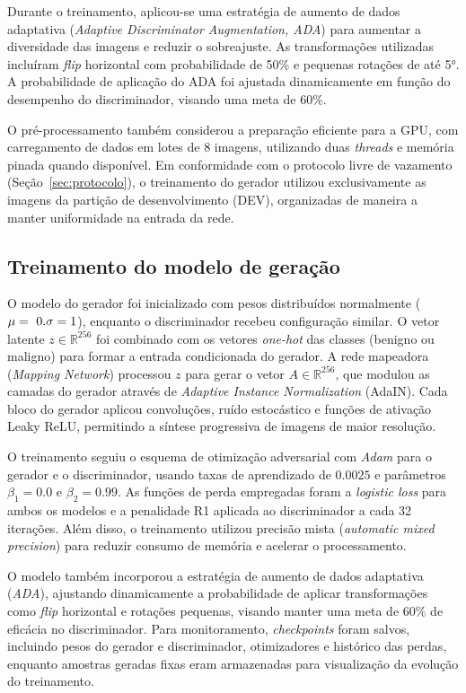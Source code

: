 \documentclass[
	12pt,				%
	openright,			%
	oneside,			%
	a4paper,			%
	tcc,			%
	]{ABNT-DC-UEL}
\begin{document}
Durante o treinamento, aplicou-se uma estratégia de aumento de dados adaptativa (\textit{Adaptive Discriminator Augmentation, ADA}) para aumentar a diversidade das imagens e reduzir o sobreajuste. As transformações utilizadas incluíram \textit{flip} horizontal com probabilidade de 50\% e pequenas rotações de até 5°. A probabilidade de aplicação do ADA foi ajustada dinamicamente em função do desempenho do discriminador, visando uma meta de 60\%.

O pré-processamento também considerou a preparação eficiente para a GPU, com carregamento de dados em lotes de 8 imagens, utilizando duas \textit{threads} e memória pinada quando disponível. Em conformidade com o protocolo livre de vazamento (Seção~\ref{sec:protocolo}), o treinamento do gerador utilizou exclusivamente as imagens da partição de desenvolvimento (DEV), organizadas de maneira a manter uniformidade na entrada da rede.
    
\subsection{Treinamento do modelo de geração}

O modelo do gerador foi inicializado com pesos distribuídos normalmente ($\mu = ~0.\\ \sigma = 1$), enquanto o discriminador recebeu configuração similar. O vetor latente $z \in \mathbb{R}^{256}$ foi combinado com os vetores \textit{one-hot} das classes (benigno ou maligno) para formar a entrada condicionada do gerador. A rede mapeadora (\textit{Mapping Network}) processou $z$ para gerar o vetor $A \in \mathbb{R}^{256}$, que modulou as camadas do gerador através de \textit{Adaptive Instance Normalization} (AdaIN). Cada bloco do gerador aplicou convoluções, ruído estocástico e funções de ativação Leaky ReLU, permitindo a síntese progressiva de imagens de maior resolução.

O treinamento seguiu o esquema de otimização adversarial com \textit{Adam} para o gerador e o discriminador, usando taxas de aprendizado de $0.0025$ e parâmetros $\beta_1 = 0.0$ e $\beta_2 = 0.99$. As funções de perda empregadas foram a \textit{logistic loss} para ambos os modelos e a penalidade R1 aplicada ao discriminador a cada 32 iterações. Além disso, o treinamento utilizou precisão mista (\textit{automatic mixed precision}) para reduzir consumo de memória e acelerar o processamento.

O modelo também incorporou a estratégia de aumento de dados adaptativa (\textit{ADA}), ajustando dinamicamente a probabilidade de aplicar transformações como \textit{flip} horizontal e rotações pequenas, visando manter uma meta de $60\%$ de eficácia no discriminador. Para monitoramento, \textit{checkpoints} foram salvos, incluindo pesos do gerador e discriminador, otimizadores e histórico das perdas, enquanto amostras geradas fixas eram armazenadas para visualização da evolução do treinamento.\\
\end{document}
